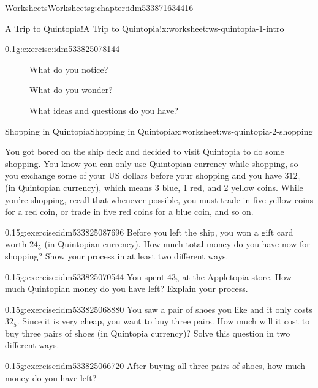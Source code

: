 \documentclass[twoside,11pt,]{book}
\begin{document}
\begin{chapterptx}{Worksheets}{}{Worksheets}{}{}{g:chapter:idm533871634416}
\begin{worksheet-section-numberless}{A Trip to Quintopia!}{}{A Trip to Quintopia!}{}{}{x:worksheet:ws-quintopia-1-intro}
\begin{divisionexercise}{2}{}{0.1}{g:exercise:idm533825078144}
\begin{description}
\item[{}]What do you notice?\item[{}]What do you wonder?\item[{}]What ideas and questions do you have?\end{description}
\end{divisionexercise}%
\end{worksheet-section-numberless}
\restoregeometry
%
%
\typeout{************************************************}
\typeout{************************************************}
%
\begin{worksheet-section-numberless}{Shopping in Quintopia}{}{Shopping in Quintopia}{}{}{x:worksheet:ws-quintopia-2-shopping}
\begin{introduction}{}%
You got bored on the ship deck and decided to visit Quintopia to do some shopping. You know you can only use Quintopian currency while shopping, so you exchange some of your US dollars before your shopping and you have \(312_{5}\) (in Quintopian currency), which means 3 blue, 1 red, and 2 yellow coins. While you’re shopping, recall that whenever possible, you must trade in five yellow coins for a red coin, or trade in five red coins for a blue coin, and so on.%
\end{introduction}%
\begin{divisionexercise}{1}{}{0.15}{g:exercise:idm533825087696}%
Before you left the ship, you won a gift card worth \(24_{5}\) (in Quintopian currency). How much total money do you have now for shopping? Show your process in at least two different ways.%
\end{divisionexercise}%
\begin{divisionexercise}{2}{}{0.15}{g:exercise:idm533825070544}%
You spent \(43_{5}\) at the Appletopia store. How much Quintopian money do you have left?  Explain your process.%
\end{divisionexercise}%
\begin{divisionexercise}{3}{}{0.15}{g:exercise:idm533825068880}%
You saw a pair of shoes you like and it only costs \(32_{5}\). Since it is very cheap, you want to buy three pairs. How much will it cost to buy three pairs of shoes (in Quintopia currency)? Solve this question in two different ways.%
\end{divisionexercise}%
\clearpage
\begin{divisionexercise}{4}{}{0.15}{g:exercise:idm533825066720}%
After buying all three pairs of shoes, how much money do you have left?%

\end{divisionexercise}
\end{worksheet-section-numberless}
\end{chapterptx}
\end{document}
